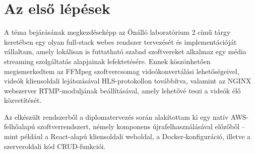 \section{Az első lépések}\label{sec:elso_lepesek}

A téma bejárásának megkezdéseképp az Önálló laboratórium 2 című tárgy keretében egy olyan full-stack webes rendszer tervezését és implementációját vállaltam, amely lokálisan is futtatható szabad szoftvereket alkalmaz egy média streaming szolgáltatás alapjainak lefektetésére. Ennek köszönhetően megismerkedtem az FFMpeg szoftvercsomag videókonvertálási lehetőségeivel, videók kliensoldali lejátszásával HLS-protokollon továbbítva, valamint az NGINX webszerver RTMP-moduljának beállításával, amely lehetővé teszi a videók élő közvetítését.

Az elkészült rendszerből a diplomatervezés során alakítottam ki egy natív AWS-felhőalapú szoftverrendszert, némely komponens újrafelhasználásával előzőből -- mint például a React-alapú kliensoldali weboldal, a Docker-konfiguráció, illetve a szerveroldali kód CRUD-funkciói.
